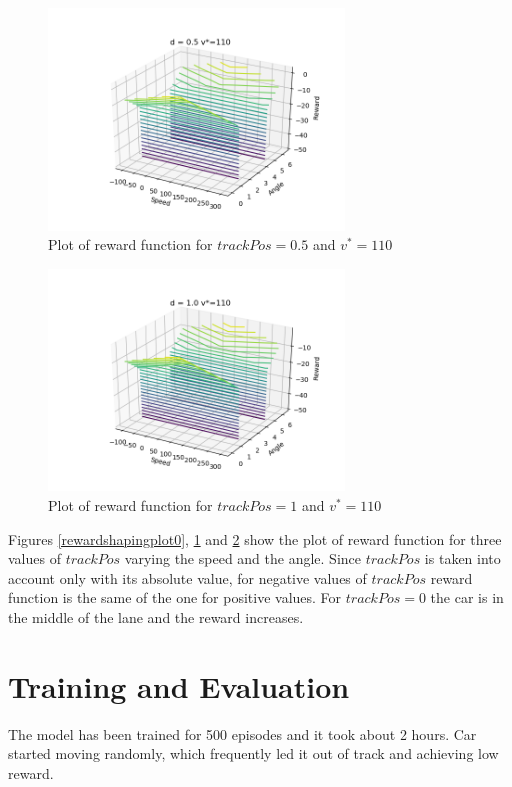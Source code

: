 \documentclass[Lau,oneside,noexaminfo]{sapthesis} %
\begin{document}
\begin{figure}[H]
  \centering
  \includegraphics[width=0.7\textwidth]{reward_plot05}
  \caption{Plot of reward function for $trackPos = 0.5$ and $v^*=110$}
  \label{rewardshapingplot05}
\end{figure}
\begin{figure}[H]
  \centering
  \includegraphics[width=0.7\textwidth]{reward_plot1}
  \caption{Plot of reward function for $trackPos = 1$ and $v^*=110$}
  \label{rewardshapingplot1}
\end{figure}
Figures \ref{rewardshapingplot0}, \ref{rewardshapingplot05} and \ref{rewardshapingplot1} show the plot of reward function for three values of $trackPos$ varying the speed and the angle. Since $trackPos$ is taken into account only with its absolute value, for negative values of $trackPos$ reward function is the same of the one for positive values. For $trackPos = 0$ the car is in the middle of the lane and the reward increases.



\chapter{Training and Evaluation}
The model has been trained for 500 episodes and it took about 2 hours. Car started moving randomly, which frequently led it out of track and achieving low reward. 
\end{document}
